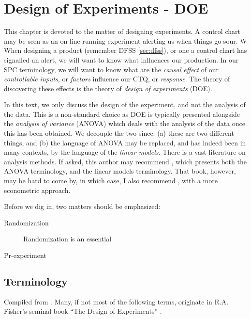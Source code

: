 \chapter[DOE]{Design of Experiments - DOE}

This chapter is devoted to the matter of designing experiments.
A control chart may be seen as an on-line running experiment alerting us when things go sour. W
When designing a product (remember DFSS \ref{sec:dfss}), or one a control chart has signalled an alert, we will want to know what influences our production.
In our SPC terminology, we will want to know what are the \emph{causal} \emph{effect} of our \emph{controllable inputs}, or \emph{factors} influence our CTQ, or \emph{response}. 
The theory of discovering these effects is the theory of \emph{design of experiments} (DOE).



\begin{remark}
In this text, we only discuss the design of the experiment, and not the analysis of the data.
This is a non-standard choice as DOE is typically presented alongside the \emph{analysis of variance} (ANOVA) which deals with the analysis of the data once this has been obtained.
We decouple the two since: 
(a) these are two different things, and 
(b) the language of ANOVA may be replaced, and has indeed been in many contexts, by the language of the \emph{linear models}.
There is a vast literature on analysis methods. 
If asked, this author may recommend \cite{hocking_analysis_1985}, which presents both the ANOVA terminology, and the linear models terminology.
That book, however, may be hard to come by, in which case, I also recommend \cite{greene_econometric_2003}, with a more econometric approach.
\end{remark}


Before we dig in, two matters should be emphasized:
\begin{description}
\item [Randomization] Randomization is an essential 
\item [Pr-experiment]
\end{description}


\section{Terminology}
Compiled from \cite{mason_statistical_2003}.
Many, if not most of the following terms, originate in R.A. Fisher's seminal book ``The Design of Experiments'' \citep{fisher_design_1960}.

